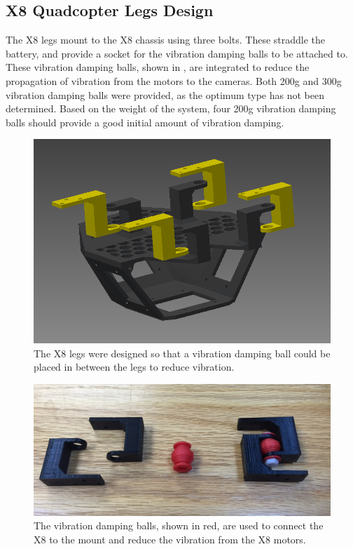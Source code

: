 	\subsection{X8 Quadcopter Legs Design}
	The X8 legs mount to the X8 chassis using three bolts.  These straddle the battery, and provide a socket for the vibration damping balls to be attached to.  These vibration damping balls, shown in , are integrated to reduce the propagation of vibration from the motors to the cameras.  Both 200g and 300g vibration damping balls were provided, as the optimum type has not been determined.  Based on the weight of the system, four 200g vibration damping balls should provide a good initial amount of vibration damping. 
	\begin{figure}[H]
		\centering
		\includegraphics[scale = 0.4]{../figures/cad/bracket.png}
		\caption{The X8 legs were designed so that a vibration damping ball could be placed in between the legs to reduce vibration.}
		\label{fig:legs}
	\end{figure}

	\begin{figure}[H]
		\centering
		\includegraphics[scale = 0.25]{../figures/vibballs.JPG}
		\caption{The vibration damping balls, shown in red, are used to connect the X8 to the mount and reduce the vibration from the X8 motors.}
		\label{fig:vibballs}
	\end{figure}
